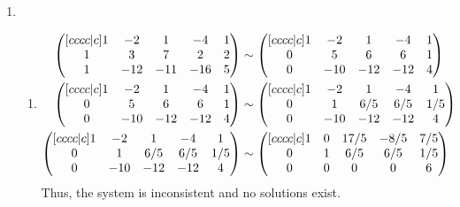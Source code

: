 \documentclass[a4paper]{article}
\begin{document}
\begin{enumerate}
		\item
		\begin{enumerate}
			\item
			\begin{align}
				\begin{pmatrix}[cccc|c]
					  1 &  -2 &   1 &  -4 &   1 \\
					  1 &   3 &   7 &   2 &   2 \\
					  1 & -12 & -11 & -16 &   5
				\end{pmatrix}
				& \sim
				\begin{pmatrix}[cccc|c]
					  1 &  -2 &   1 &  -4 &   1 \\
					  0 &   5 &   6 &   6 &   1 \\
					  0 & -10 & -12 & -12 &   4
				\end{pmatrix} \label{eq:2a} \\
				\begin{pmatrix}[cccc|c]
					  1 &  -2 &   1 &  -4 &   1 \\
					  0 &   5 &   6 &   6 &   1 \\
					  0 & -10 & -12 & -12 &   4
				\end{pmatrix}
				& \sim
				\begin{pmatrix}[cccc|c]
					  1 &  -2 &   1 &  -4 &   1 \\
					  0 &   1 & 6/5 & 6/5 & 1/5 \\
					  0 & -10 & -12 & -12 &   4
				\end{pmatrix} \notag \\
				\begin{pmatrix}[cccc|c]
					  1 &  -2 &   1 &  -4 &   1 \\
					  0 &   1 & 6/5 & 6/5 & 1/5 \\
					  0 & -10 & -12 & -12 &   4
				\end{pmatrix}
				& \sim
				\begin{pmatrix}[cccc|c]
					  1 &   0 & 17/5 & -8/5 & 7/5 \\
					  0 &   1 &  6/5 &  6/5 & 1/5 \\
					  0 &   0 &    0 &    0 &   6
				\end{pmatrix} \label{eq:2a-sol}
			\end{align}
			Thus, the system is inconsistent and no solutions exist.
			

\end{enumerate}
\end{enumerate}
\end{document}
